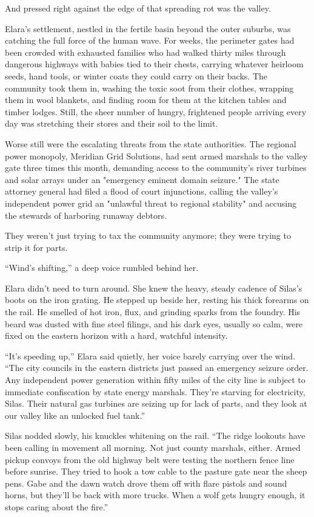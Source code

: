 And pressed right against the edge of that spreading rot was the valley. 

Elara’s settlement, nestled in the fertile basin beyond the outer suburbs, was catching the full force of the human wave. For weeks, the perimeter gates had been crowded with exhausted families who had walked thirty miles through dangerous highways with babies tied to their chests, carrying whatever heirloom seeds, hand tools, or winter coats they could carry on their backs. The community took them in, washing the toxic soot from their clothes, wrapping them in wool blankets, and finding room for them at the kitchen tables and timber lodges. Still, the sheer number of hungry, frightened people arriving every day was stretching their stores and their soil to the limit.

Worse still were the escalating threats from the state authorities. The regional power monopoly, Meridian Grid Solutions, had sent armed marshals to the valley gate three times this month, demanding access to the community’s river turbines and solar arrays under an "emergency eminent domain seizure." The state attorney general had filed a flood of court injunctions, calling the valley’s independent power grid an "unlawful threat to regional stability" and accusing the stewards of harboring runaway debtors. 

They weren't just trying to tax the community anymore; they were trying to strip it for parts.

``Wind’s shifting,'' a deep voice rumbled behind her.

Elara didn't need to turn around. She knew the heavy, steady cadence of Silas's boots on the iron grating. He stepped up beside her, resting his thick forearms on the rail. He smelled of hot iron, flux, and grinding sparks from the foundry. His beard was dusted with fine steel filings, and his dark eyes, usually so calm, were fixed on the eastern horizon with a hard, watchful intensity.

``It’s speeding up,'' Elara said quietly, her voice barely carrying over the wind. ``The city councils in the eastern districts just passed an emergency seizure order. Any independent power generation within fifty miles of the city line is subject to immediate confiscation by state energy marshals. They're starving for electricity, Silas. Their natural gas turbines are seizing up for lack of parts, and they look at our valley like an unlocked fuel tank.''

Silas nodded slowly, his knuckles whitening on the rail. ``The ridge lookouts have been calling in movement all morning. Not just county marshals, either. Armed pickup convoys from the old highway belt were testing the northern fence line before sunrise. They tried to hook a tow cable to the pasture gate near the sheep pens. Gabe and the dawn watch drove them off with flare pistols and sound horns, but they'll be back with more trucks. When a wolf gets hungry enough, it stops caring about the fire.''

